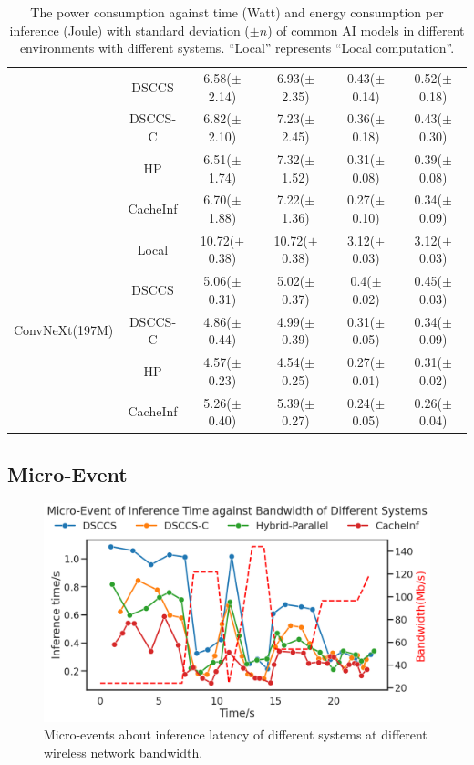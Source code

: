 \begin{table}[htb]
\begin{tabular}{cc|c|c|c|c}
& DSCCS & 6.58($\pm$2.14) & 6.93($\pm$2.35) & 0.43($\pm$0.14) & 0.52($\pm$0.18) \\
 & DSCCS-C & 6.82($\pm$2.10) & 7.23($\pm$2.45) & 0.36($\pm$0.18) & 0.43($\pm$0.30) \\
 & HP & 6.51($\pm$1.74) & 7.32($\pm$1.52) & 0.31($\pm$0.08) & 0.39($\pm$0.08) \\
 & CacheInf & 6.70($\pm$1.88) & 7.22($\pm$1.36) & 0.27($\pm$0.10) & 0.34($\pm$0.09) \\
\cline{1-6}
\multirow[c]{5}{*}{ConvNeXt(197M)} & Local & 10.72($\pm$0.38) & 10.72($\pm$0.38) & 3.12($\pm$0.03) & 3.12($\pm$0.03) \\
& DSCCS & 5.06($\pm$0.31) & 5.02($\pm$0.37) & 0.4($\pm$0.02) & 0.45($\pm$0.03) \\
 & DSCCS-C & 4.86($\pm$0.44) & 4.99($\pm$0.39) & 0.31($\pm$0.05) & 0.34($\pm$0.09) \\
 & HP & 4.57($\pm$0.23) & 4.54($\pm$0.25) & 0.27($\pm$0.01) & 0.31($\pm$0.02) \\
 & CacheInf & 5.26($\pm$0.40) & 5.39($\pm$0.27) & 0.24($\pm$0.05) & 0.26($\pm$0.04) \\
\cline{1-6}
\bottomrule
\end{tabular}
    \caption{The power consumption against time (Watt) and energy consumption per inference (Joule) with standard deviation ($\pm n$) of common AI models in different environments with different systems. ``Local'' represents ``Local computation''.}
    \label{tab:torchvision_power}
\end{table}

\subsection{Micro-Event}
\begin{figure}
    \includegraphics[width=0.98\linewidth]{fig/MicroEvent2.png}
    \caption[short]{Micro-events about inference latency of different systems at different wireless network bandwidth.}
\end{figure}


